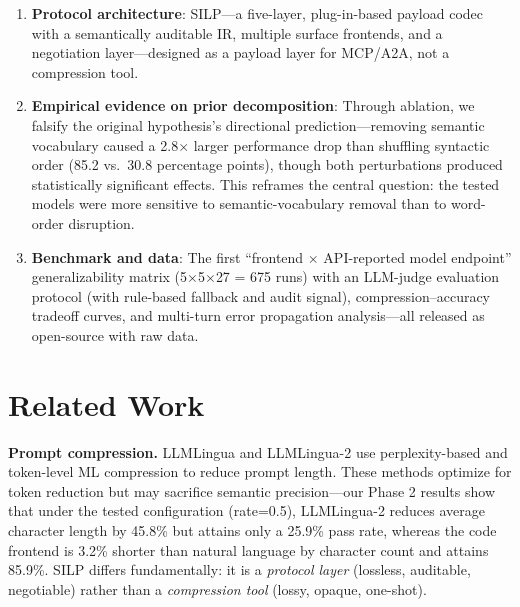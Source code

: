 \documentclass{article}
\begin{document}
\begin{enumerate}


\item

  \textbf{Protocol architecture}: SILP---a five-layer, plug-in-based payload codec with a semantically auditable IR, multiple surface frontends, and a negotiation layer---designed as a payload layer for MCP/A2A, not a compression tool.

\item

  \textbf{Empirical evidence on prior decomposition}: Through ablation, we falsify the original hypothesis's directional prediction---removing semantic vocabulary caused a 2.8$\times$ larger performance drop than shuffling syntactic order (85.2 vs.~30.8 percentage points), though both perturbations produced statistically significant effects. This reframes the central question: the tested models were more sensitive to semantic-vocabulary removal than to word-order disruption.

\item

  \textbf{Benchmark and data}: The first ``frontend $\times$ API-reported model endpoint'' generalizability matrix (5$\times$5$\times$27 = 675 runs) with an LLM-judge evaluation protocol (with rule-based fallback and audit signal), compression--accuracy tradeoff curves, and multi-turn error propagation analysis---all released as open-source with raw data.

\end{enumerate}



\section{Related Work}\label{related-work}



\textbf{Prompt compression.} LLMLingua \citep{jiang2023llmlingua} and LLMLingua-2 \citep{pan2024llmlingua2} use perplexity-based and token-level ML compression to reduce prompt length. These methods optimize for token reduction but may sacrifice semantic precision---our Phase 2 results show that under the tested configuration (rate=0.5), LLMLingua-2 reduces average character length by 45.8\% but attains only a 25.9\% pass rate, whereas the code frontend is 3.2\% shorter than natural language by character count and attains 85.9\%. SILP differs fundamentally: it is a \emph{protocol layer} (lossless, auditable, negotiable) rather than a \emph{compression tool} (lossy, opaque, one-shot).
\end{document}
